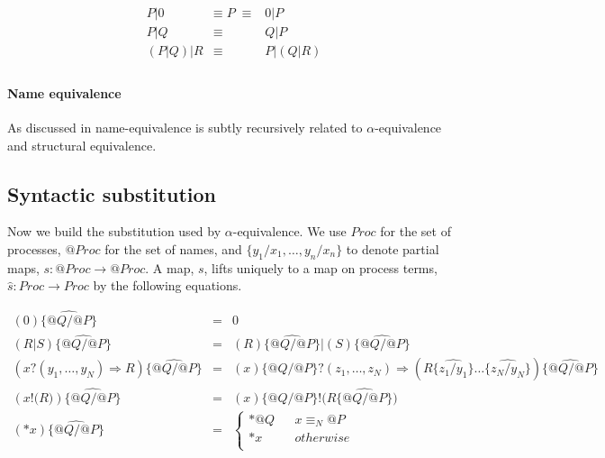 \documentclass[]{amsart}
\makeatletter
\newcommand{\id}[1]{\texttt{#1}}
\newcommand{\pzero}{\mathbin{0}}
\newcommand{\juxtap}{\mathbin{\id{|}}}
\newcommand{\scong}{\mathbin{\equiv}}
\newcommand{\nameeq}{\mathbin{\equiv_N}}
\newcommand{\quotep}[1]{@#1}
\newcommand{\dropn}[1]{*#1}
\newcommand{\substp}[2]{\id{\{} \quotep{#1} / \quotep{#2} \id{\}}}
\newcommand{\substn}[2]{\id{\{} #1 / #2 \id{\}}}
\newcommand{\psubstp}[2]{\widehat{\substp{#1}{#2}}}
\newcommand{\psubstn}[2]{\widehat{\substn{#1}{#2}}}
\newcommand{\Proc}{\mathbin{Proc}}
\newcommand{\QProc}{\quotep{\mathbin{Proc}}}
\theoremstyle{definition}
\theoremstyle{remark}
\numberwithin{equation}{subsection}
\makeatother
\begin{document}
\begin{eqnarray*}
	{P} \juxtap \pzero	
		&  \scong \; {P} \; \scong & 
			\pzero \juxtap {P} \\
	{P} \juxtap {Q}	
		& \scong & 
			{Q} \juxtap {P} \\
	({P} \juxtap {Q}) \juxtap {R}
		& \scong & 
			{P} \juxtap ({Q} \juxtap {R}) \\
\end{eqnarray*}

\paragraph{Name equivalence} As discussed in
\cite{DBLP:journals/tgc/MeredithR05} name-equivalence is subtly
recursively related to $\alpha$-equivalence and structural equivalence.

\subsection{Syntactic substitution}

Now we build the substitution used by $\alpha$-equivalence. We use
$\Proc$ for the set of processes, $\QProc$ for the set of names, and
${\{}{y_1} / {x_1}, \ldots, {y_n} / {x_n}{\}}$ to denote partial maps, $s : \QProc
\rightarrow \QProc$. A map, $s$, lifts uniquely to a map on process terms, $\widehat{s} :
\Proc \rightarrow \Proc$ by the following equations.

\begin{eqnarray*}
(0) \psubstp{Q}{P}         & = &    0 \\
(R \juxtap S) \psubstp{Q}{P}
		& = &    
		(R)\psubstp{Q}{P} \juxtap (S) \psubstp{Q}{P} \\
({x}{?}{( y_1, \ldots, y_N )} \Rightarrow R) \psubstp{Q}{P}    
		& = &    
		{(x)}\substp{Q}{P}{?}{( z_1, \ldots, z_N )}\Rightarrow (R \psubstn{z_1}{y_1}\ldots\psubstn{z_N}{y_N}) \psubstp{Q}{P} \\
({x}{!}{(}{R}{)}) \psubstp{Q}{P}  
 		& = &
 		{(x)\substp{Q}{P}}{!}{(}{ R \psubstp{Q}{P} }{)} \\
({*}{x})  \psubstp{Q}{P}       
		& = & 
		\left\{ 
			\begin{array}{ccc} 
				\dropn{\quotep{Q}} & & x \nameeq \quotep{P} \\
                              	\dropn{x} & & otherwise \\
			\end{array}
		\right.
\end{eqnarray*}
 
\end{document}
